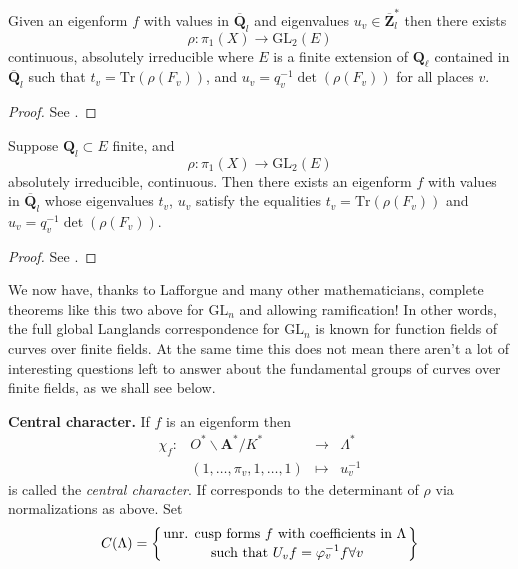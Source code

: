 \begin{theorem}
\label{theorem-drinfeld-make-rho}
Given an eigenform $f$ with values in
$\overline{\mathbf{Q}}_l$ and eigenvalues
$u_v\in \overline{\mathbf{Z}}_l^*$ then there exists
$$
\rho: \pi_1(X)\to \text{GL}_2(E)
$$
continuous, absolutely irreducible where
$E$ is a finite extension of $\mathbf{Q}_\ell$ contained in
$\overline{\mathbf{Q}}_l$ such that
$t_v = \text{Tr}(\rho(F_v))$, and
$u_v = q_v^{-1}\det\left(\rho(F_v)\right)$ for all places $v$.
\end{theorem}

\begin{proof}
See \cite{D0}.
\end{proof}

\begin{theorem}
\label{theorem-drinfeld-make-f}
Suppose $\mathbf{Q}_l \subset E$ finite, and
$$
\rho: \pi_1(X)\to \text{GL}_2(E)
$$
absolutely irreducible, continuous. Then there exists an eigenform $f$ with
values in $\overline{\mathbf{Q}}_l$ whose eigenvalues $t_v$, $u_v$
satisfy the equalities
$t_v = \text{Tr}(\rho(F_v))$ and $u_v=q_v^{-1}\det(\rho(F_v))$.
\end{theorem}

\begin{proof}
See \cite{D1}.
\end{proof}

\begin{remark}
\label{remark-lafforgue}
We now have, thanks to Lafforgue and many other mathematicians,
complete theorems like this two above for $\text{GL}_n$
and allowing ramification!
In other words, the full global Langlands correspondence for $\text{GL}_n$
is known for function fields of curves over finite fields. At the same
time this does not mean there aren't a lot of interesting questions left
to answer about the fundamental groups of curves over finite fields, as
we shall see below.
\end{remark}

\noindent
{\bf Central character.} If $f$ is an eigenform then
$$
\begin{matrix}
\chi_f : &
O^*\backslash \mathbf{A}^*/K^* &
\to &
\Lambda^* \\
&
(1, \ldots, \pi_v, 1, \ldots, 1) &
\mapsto &
u_v^{-1}
\end{matrix}
$$
is called the {\it central character}. If corresponds to the
determinant of $\rho$ via normalizations as above. Set
$$
C(\Lambda)=\left\{{\text{unr. cusp forms } f \text{ with coefficients
in }\Lambda}\atop {\text{ such that } U_v f = \varphi_v^{-1}f\forall
v}\right\}
$$

